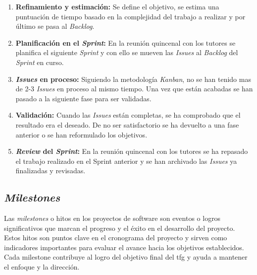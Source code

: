 \begin{enumerate}
    \item \textbf{Refinamiento y estimación:} Se define el objetivo, se estima una puntuación de tiempo basado en la complejidad del trabajo a realizar y por último se pasa al \textit{Backlog}.

    \item \textbf{Planificación en el \textit{Sprint}:} En la reunión quincenal con los tutores se planifica el siguiente \textit{Sprint} y con ello se mueven las \textit{Issues} al \textit{Backlog} del \textit{Sprint} en curso.

    \item \textbf{\textit{Issues} en proceso:} Siguiendo la metodología \textit{Kanban}, no se han tenido mas de 2-3 \textit{Issues} en proceso al mismo tiempo. Una vez que están acabadas se han pasado a la siguiente fase para ser validadas.

    \item \textbf{Validación:} Cuando las \textit{Issues} están completas, se ha comprobado que el resultado era el deseado. De no ser satisfactorio se ha devuelto a una fase anterior o se han reformulado los objetivos.

    \item \textbf{\textit{Review} del \textit{Sprint}:} En la reunión quincenal con los tutores se ha repasado el trabajo realizado en el Sprint anterior y se han archivado las \textit{Issues} ya finalizadas y revisadas.
\end{enumerate}


\subsection{\textit{Milestones}}

Las \textit{milestones} o hitos en los proyectos de software son eventos o logros significativos que marcan el progreso y el éxito en el desarrollo del proyecto. Estos hitos son puntos clave en el cronograma del proyecto y sirven como indicadores importantes para evaluar el avance hacia los objetivos establecidos. Cada milestone contribuye al logro del objetivo final del \acrshort{tfg} y ayuda a mantener el enfoque y la dirección.

